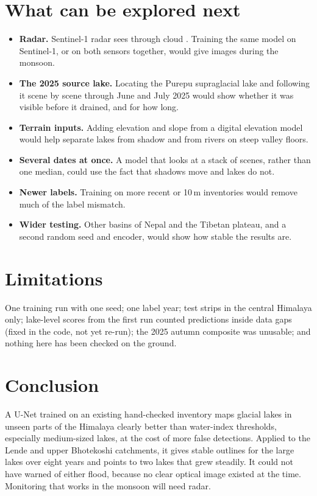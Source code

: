 \documentclass[11pt,a4paper]{article}
\begin{document}
\section{What can be explored next}
\begin{itemize}
\item \textbf{Radar.} Sentinel-1 radar sees through cloud \cite{torres2012}. Training the same model on Sentinel-1, or on both sensors together, would give images during the monsoon.
\item \textbf{The 2025 source lake.} Locating the Purepu supraglacial lake and following it scene by scene through June and July 2025 would show whether it was visible before it drained, and for how long.
\item \textbf{Terrain inputs.} Adding elevation and slope from a digital elevation model would help separate lakes from shadow and from rivers on steep valley floors.
\item \textbf{Several dates at once.} A model that looks at a stack of scenes, rather than one median, could use the fact that shadows move and lakes do not.
\item \textbf{Newer labels.} Training on more recent or 10\,m inventories would remove much of the label mismatch.
\item \textbf{Wider testing.} Other basins of Nepal and the Tibetan plateau, and a second random seed and encoder, would show how stable the results are.
\end{itemize}

\section{Limitations}
One training run with one seed; one label year; test strips in the central Himalaya only; lake-level scores from the first run counted predictions inside data gaps (fixed in the code, not yet re-run); the 2025 autumn composite was unusable; and nothing here has been checked on the ground.

\section{Conclusion}
A U-Net trained on an existing hand-checked inventory maps glacial lakes in unseen parts of the Himalaya clearly better than water-index thresholds, especially medium-sized lakes, at the cost of more false detections. Applied to the Lende and upper Bhotekoshi catchments, it gives stable outlines for the large lakes over eight years and points to two lakes that grew steadily. It could not have warned of either flood, because no clear optical image existed at the time. Monitoring that works in the monsoon will need radar.
\end{document}
